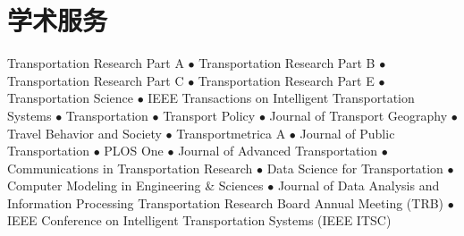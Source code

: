 
\section{学术服务}
Transportation Research Part A $\bullet$ Transportation Research Part B $\bullet$ Transportation Research Part C $\bullet$ Transportation Research Part E $\bullet$ Transportation Science $\bullet$ IEEE Transactions on Intelligent Transportation Systems $\bullet$  Transportation  $\bullet$ Transport Policy $\bullet$ Journal of Transport Geography $\bullet$ Travel Behavior and Society $\bullet$ Transportmetrica A  $\bullet$ Journal of Public Transportation $\bullet$ PLOS One $\bullet$ Journal of Advanced Transportation $\bullet$ Communications in Transportation Research $\bullet$ Data Science for Transportation $\bullet$ Computer Modeling in Engineering \& Sciences $\bullet$ Journal of Data Analysis and Information Processing 
Transportation Research Board Annual Meeting (TRB) $\bullet$ IEEE Conference on Intelligent Transportation Systems (IEEE ITSC)

